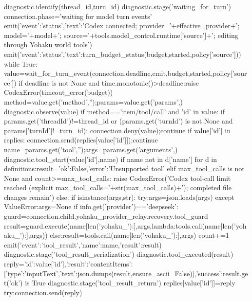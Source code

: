         diagnostic.identify(thread_id,turn_id)
        diagnostic.stage('waiting_for_turn')
        connection.phase='waiting for model turn events'
        emit({'event':'status','text':'Codex connected; provider='+effective_provider+'; model='+model+'; source='+tools.model_control.runtime['source']+'; editing through Yohaku world tools'})
        emit({'event':'status','text':turn_budget_status(budget,started,policy['source'])})
        while True:
            value=wait_for_turn_event(connection,deadline,emit,budget,started,policy['source'])
            if deadline is not None and time.monotonic()>deadline:raise CodexError(timeout_error(budget))
            method=value.get('method','');params=value.get('params',{})
            diagnostic.observe(value)
            if method=='item/tool/call' and 'id' in value:
                if params.get('threadId')!=thread_id or (params.get('turnId') is not None and params['turnId']!=turn_id):
                    connection.deny(value);continue
                if value['id'] in replies:
                    connection.send(replies[value['id']]);continue
                name=params.get('tool','');args=params.get('arguments',{})
                diagnostic.tool_start(value['id'],name)
                if name not in {d['name'] for d in definitions}:result={'ok':False,'error':'Unsupported tool'}
                elif max_tool_calls is not None and count>=max_tool_calls:
                    raise CodexError('Codex tool-call limit reached (explicit max_tool_calls='+str(max_tool_calls)+'); completed file changes remain')
                else:
                    if isinstance(args,str):
                        try:args=json.loads(args)
                        except ValueError:args=None
                    if info.get('provider')=='deepseek':
                        guard=connection.child.yohaku_provider_relay.recovery.tool_guard
                        result=guard.execute(name[len('yohaku_'):],args,lambda:tools.call(name[len('yohaku_'):],args))
                    else:result=tools.call(name[len('yohaku_'):],args)
                    count+=1
                    emit({'event':'tool_result','name':name,'result':result})
                diagnostic.stage('tool_result_serialization')
                diagnostic.tool_executed(result)
                reply={'id':value['id'],'result':{'contentItems':[{'type':'inputText','text':json.dumps(result,ensure_ascii=False)}],'success':result.get('ok') is True}}
                diagnostic.stage('tool_result_return')
                replies[value['id']]=reply
                try:connection.send(reply)
